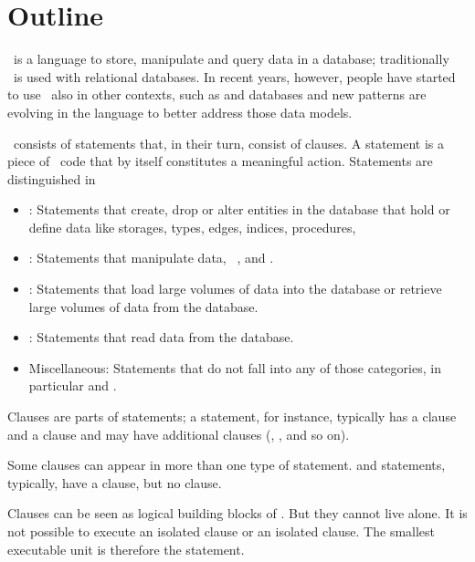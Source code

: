 \section{Outline}
\sql\ is a language to store, manipulate
and query data in a database; traditionally
\sql\ is used with relational databases.
In recent years, however, people have
started to use \sql\ also in other contexts,
such as  and 
databases and new patterns are evolving
in the language to better address those
data models.

\sql\ consists of statements that,
in their turn, consist of clauses.
A statement is a piece of \sql\ code
that by itself constitutes a meaningful
action. Statements are
distinguished in

\begin{itemize}
\item {}:
Statements that create, drop or alter entities
in the database that hold or define
data
like storages, types, edges, indices,
procedures, \etc\

\item {}:
Statements that manipulate data,
\eg\ ,  and
.

\item {}:
Statements that load large volumes of data into the database
or retrieve large volumes of data from the database.

\item {}:
Statements that read data from the database.

\item Miscellaneous:
Statements that do not fall into any of
those categories, in particular
 and .
\end{itemize}

Clauses are parts of statements;
a  statement, for instance,
typically has a  clause and
a  clause and may have
additional clauses (,
,  and so on).

Some clauses can appear in more than
one type of statement. 
and  statements, typically,
have a  clause, but no
 clause.

Clauses can be seen as logical building blocks
of \sql. But they cannot live alone.
It is not possible to execute an isolated 
clause or an isolated  clause.
The smallest executable unit is therefore the statement.

